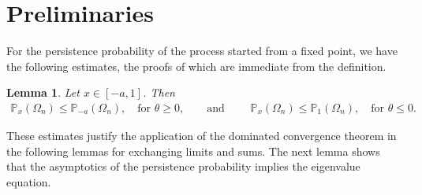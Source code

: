 \documentclass[12pt]{article}
\renewcommand{\P}{\mathbb{P}} %
\newcommand{\1}{\mathds{1}}
\theoremstyle{definition}
\theoremstyle{plain}
\newtheorem{Lemma}[definition]{Lemma}
\theoremstyle{remark}
\begin{document}
\section{Preliminaries}
For the persistence probability of the process started from a fixed point, we have the following estimates, the proofs of which are immediate from the definition.
\begin{Lemma}\label{P_x_estimate}
    Let $x\in[-a,1]$. Then %
    \begin{align*}
        \P_x(\Omega_n)\leq\P_{-a}(\Omega_n),\quad \text{for $\theta\geq 0$},\qquad \text{and }\qquad  \P_x(\Omega_n)\leq\P_{1}(\Omega_n),\quad \text{for $\theta\leq 0$}.
    \end{align*}
\end{Lemma}

These estimates justify the application of the dominated convergence theorem in the following lemmas for exchanging limits and sums. The next lemma shows that the asymptotics of the persistence probability implies the eigenvalue equation.
\end{document}
